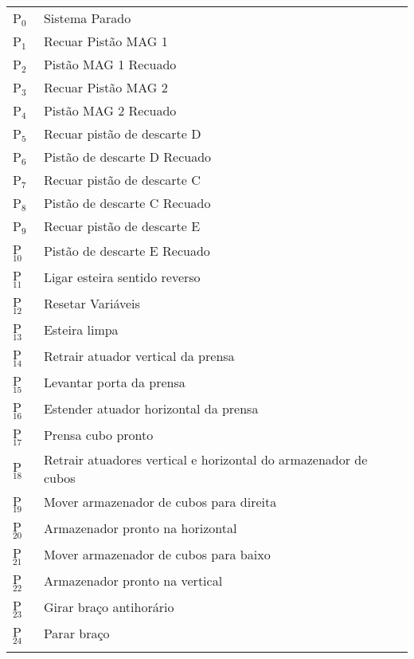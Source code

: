 \documentclass[11pt]{article}
\begin{document}
\begin{center}
\begin{tabular}{ll}
P$_{\text{0}}$ & Sistema Parado\\
P$_{\text{1}}$ & Recuar Pistão MAG 1\\
P$_{\text{2}}$ & Pistão MAG 1 Recuado\\
P$_{\text{3}}$ & Recuar Pistão MAG 2\\
P$_{\text{4}}$ & Pistão MAG 2 Recuado\\
P$_{\text{5}}$ & Recuar pistão de descarte D\\
P$_{\text{6}}$ & Pistão de descarte D Recuado\\
P$_{\text{7}}$ & Recuar pistão de descarte C\\
P$_{\text{8}}$ & Pistão de descarte C Recuado\\
P$_{\text{9}}$ & Recuar pistão de descarte E\\
P$_{\text{10}}$ & Pistão de descarte E Recuado\\
P$_{\text{11}}$ & Ligar esteira sentido reverso\\
P$_{\text{12}}$ & Resetar Variáveis\footnotemark\\
P$_{\text{13}}$ & Esteira limpa\\
P$_{\text{14}}$ & Retrair atuador vertical da prensa\\
P$_{\text{15}}$ & Levantar porta da prensa\\
P$_{\text{16}}$ & Estender atuador horizontal da prensa\\
P$_{\text{17}}$ & Prensa cubo pronto\\
P$_{\text{18}}$ & Retrair atuadores vertical e horizontal do armazenador de cubos\\
P$_{\text{19}}$ & Mover armazenador de cubos para direita\\
P$_{\text{20}}$ & Armazenador pronto na horizontal\\
P$_{\text{21}}$ & Mover armazenador de cubos para baixo\\
P$_{\text{22}}$ & Armazenador pronto na vertical\\
P$_{\text{23}}$ & Girar braço antihorário\footnotemark\\
P$_{\text{24}}$ & Parar braço\\
 & \\
\end{tabular}
\end{center}
\end{document}
